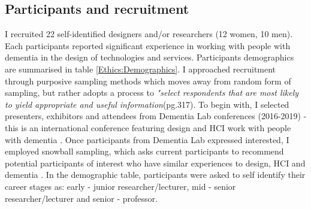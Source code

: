 \subsection{Participants and recruitment}
\label{Ethics:Participants}
I recruited 22 self-identified designers and/or researchers (12 women, 10 men). Each participants reported significant experience in working with people with dementia in the design of technologies and services. Participants demographics are summarised in table \ref{Ethics:Demographics}. I approached recruitment through purposive sampling methods which moves away from random form of sampling, but rather adopts a process to \textit{"select respondents that are most likely to yield appropriate and useful information}(pg.317)\citep{kelly2010qualitative}. To begin with, I selected presenters, exhibitors and attendees from Dementia Lab conferences (2016-2019) - this is an international conference featuring design and HCI work with people with dementia \citep{brankaert_dementia_2019}. Once participants from Dementia Lab expressed interested, I employed snowball sampling, which asks current participants to recommend potential participants of interest who have similar experiences to design, HCI and dementia \citep{noy_sampling_2008}. In the demographic table, participants were asked to self identify their career stages as: early - junior researcher/lecturer, mid - senior researcher/lecturer and senior - professor.

